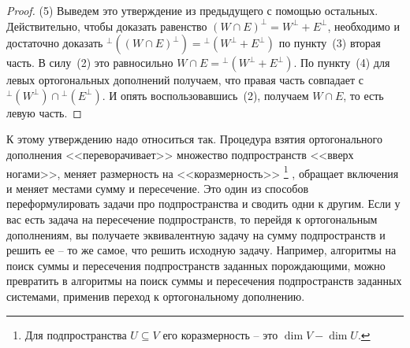 \begin{proof}
(5) Выведем это утверждение из предыдущего с помощью остальных.
Действительно, чтобы доказать равенство $(W\cap E)^\bot = W^\bot + E^\bot$, необходимо и достаточно доказать ${}^\bot((W\cap E)^\bot) = {}^\bot(W^\bot + E^\bot)$ по пункту~(3) вторая часть.
В силу~(2) это равносильно $W\cap E = {}^\bot(W^\bot+E^\bot)$.
По пункту~(4) для левых ортогональных дополнений получаем, что правая часть совпадает с ${}^\bot(W^\bot) \cap {}^\bot(E^\bot)$.
И опять воспользовавшись~(2), получаем $W\cap E$, то есть левую часть.
\end{proof}

К этому утверждению надо относиться так.
Процедура взятия ортогонального дополнения <<переворачивает>> множество подпространств <<вверх ногами>>, меняет размерность на <<коразмерность>>%
\footnote{Для подпространства $U\subseteq V$ его коразмерность -- это $\dim V - \dim U$.}%
, обращает включения и меняет местами сумму и пересечение.
Это один из способов переформулировать задачи про подпространства и сводить одни к другим.
Если у вас есть задача на пересечение подпространств, то перейдя к ортогональным дополнениям, вы получаете эквивалентную задачу на сумму подпространств и решить ее -- то же самое, что решить исходную задачу.
Например, алгоритмы на поиск суммы и пересечения подпространств заданных порождающими, можно превратить в алгоритмы на поиск суммы и пересечения подпространств заданных системами, применив переход к ортогональному дополнению.
